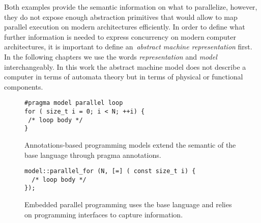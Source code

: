 Both examples provide the semantic information on what to parallelize, however, they do not expose enough abstraction primitives that would allow to map parallel execution on modern architectures efficiently. In order to define what further information is needed to express concurrency on modern computer architectures, it is important to define an~\emph{abstract machine representation} first. In the following chapters we use the words \emph{representation} and \emph{model} interchangeably. In this work the abstract machine model does not describe a computer in terms of automata theory but in terms of physical or functional components.

\begin{figure}
\begin{verbatim}
#pragma model parallel loop
for ( size_t i = 0; i < N; ++i) {
 /* loop body */
}
\end{verbatim}
\caption{Annotations-based programming models extend the semantic of the base language through pragma annotations.}
\label{figOMPLike}
\end{figure}

\begin{figure}
\begin{verbatim}
model::parallel_for (N, [=] ( const size_t i) {
  /* loop body */
});
\end{verbatim}
\caption{Embedded parallel programming uses the base language and relies on programming interfaces to capture information.}
\label{figKokkosLike}
\end{figure}
